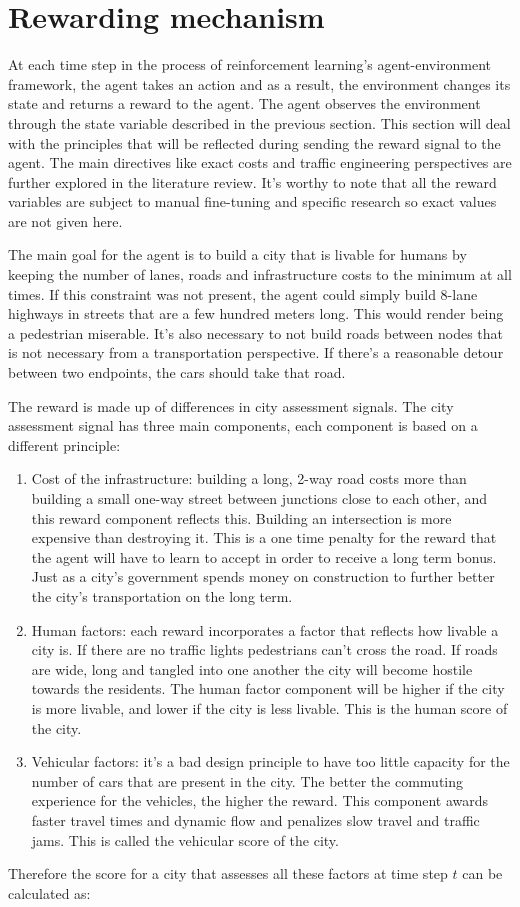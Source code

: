 \documentclass[
]{elteikthesis}[2023/04/10]
\begin{document}
\section{Rewarding mechanism }

At each time step in the process of reinforcement learning's agent-environment
framework, the agent takes an action and as a result, the environment
changes its state and returns a reward to the agent. The agent observes
the environment through the state variable described in the previous
section. This section will deal with the principles that will be reflected
during sending the reward signal to the agent. The main directives
like exact costs and traffic engineering perspectives are further
explored in the literature review. It's worthy to note that all the
reward variables are subject to manual fine-tuning and specific research
so exact values are not given here.

The main goal for the agent is to build a city that is livable for
humans by keeping the number of lanes, roads and infrastructure costs
to the minimum at all times. If this constraint was not present, the
agent could simply build 8-lane highways in streets that are a few
hundred meters long. This would render being a pedestrian miserable.
It's also necessary to not build roads between nodes that is not necessary
from a transportation perspective. If there's a reasonable detour
between two endpoints, the cars should take that road.

The reward is made up of differences in city assessment signals. The
city assessment signal has three main components, each component is
based on a different principle: 
\begin{enumerate}
\item Cost of the infrastructure: building a long, 2-way road costs more
than building a small one-way street between junctions close to each
other, and this reward component reflects this. Building an intersection
is more expensive than destroying it. This is a one time penalty for
the reward that the agent will have to learn to accept in order to
receive a long term bonus. Just as a city's government spends money
on construction to further better the city's transportation on the
long term. 
\item Human factors: each reward incorporates a factor that reflects how
livable a city is. If there are no traffic lights pedestrians can't
cross the road. If roads are wide, long and tangled into one another
the city will become hostile towards the residents. The human factor component
will be higher if the city is more livable, and lower if the city
is less livable. This is the human score of the city.
\item Vehicular factors: it's a bad design principle to have too little
capacity for the number of cars that are present in the city. The
better the commuting experience for the vehicles, the higher the reward.
This component awards faster travel times and dynamic flow and penalizes
slow travel and traffic jams. This is called the vehicular score of
the city. 
\end{enumerate}
Therefore the score for a city that assesses all these factors at
time step $t$ can be calculated as: 
\end{document}
